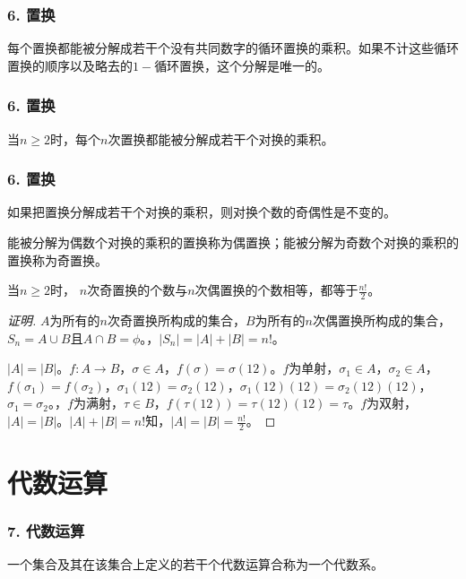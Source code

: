 \documentclass{beamer}
\begin{document}
\begin{CJK*}{UTF8}{gbsn}
 \begin{frame}
   \frametitle{6. 置换}
   \begin{Thm}
    每个置换都能被分解成若干个没有共同数字的循环置换的乘积。如果不计这些循环置换的顺序以及略去的$1-$循环置换，这个分解是唯一的。
   \end{Thm}
 \end{frame}

 \begin{frame}
   \frametitle{6. 置换}
   \begin{Thm}
    当$n\geq 2$时，每个$n$次置换都能被分解成若干个对换的乘积。
   \end{Thm}
 \end{frame}

 \begin{frame}
   \frametitle{6. 置换}
   \begin{Thm}
    如果把置换分解成若干个对换的乘积，则对换个数的奇偶性是不变的。
  \end{Thm}
  \pause
  \begin{Def}
    能被分解为偶数个对换的乘积的置换称为\alert{偶置换}；能被分解为奇数个对换的乘积的置换称为\alert{奇置换}。
  \end{Def}
 \end{frame}
 \begin{frame}
  \begin{Thm}
    当$n \geq 2$时， $n$次奇置换的个数与$n$次偶置换的个数相等，都等于$\frac{n!}{2}$。
  \end{Thm}
  \pause
  \begin{proof}[证明]\justifying\let\raggedright\justifying
    $A$为所有的$n$次奇置换所构成的集合，\pause$B$为所有的$n$次偶置换所构成的集合，$S_n=A\cup B$且$A\cap B=\phi$。，\pause$|S_n|=|A| + |B|=n!$。
  
    $|A|=|B|$。$f:A\to B$，$\sigma\in A$，\pause$f(\sigma) = \sigma(12)$。$f$为单射，$\sigma_1\in A$，\pause$\sigma_2\in A$，$f(\sigma_1)=f(\sigma_2)$，$\sigma_1(12)=\sigma_2(12)$，$\sigma_1(12)(12)=\sigma_2(12)(12)$，$\sigma_1=\sigma_2$。，$f$为满射，$\tau \in B$，\pause$f(\tau(12))=\tau(12)(12)=\tau$。$f$为双射，$|A|=|B|$。$|A|+|B|=n!$知，\pause$|A|=|B|=\frac{n!}{2}$。
  \end{proof}  
 \end{frame}
\section{代数运算}
\begin{frame}
  \frametitle{7. 代数运算}
  \begin{Def}
    一个集合及其在该集合上定义的若干个代数运算合称为一个\alert{代数系}。
  \end{Def}


\end{frame}
\end{CJK*}
\end{document}
